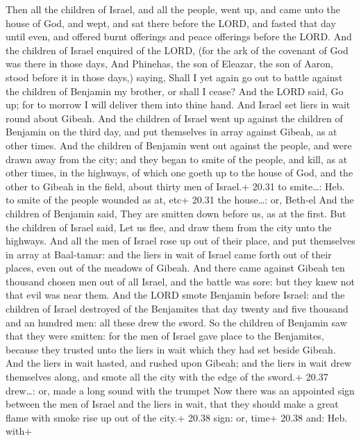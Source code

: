  Then all the children of Israel, and all the people,
went up, and came unto the house of God, and wept, and sat there before
the LORD, and fasted that day until even, and offered burnt offerings
and peace offerings before the LORD.  And the children of
Israel enquired of the LORD, (for the ark of the covenant of God was
there in those days,  And Phinehas, the son of Eleazar, the
son of Aaron, stood before it in those days,) saying, Shall I yet again
go out to battle against the children of Benjamin my brother, or shall I
cease? And the LORD said, Go up; for to morrow I will deliver them into
thine hand.  And Israel set liers in wait round about
Gibeah.  And the children of Israel went up against the
children of Benjamin on the third day, and put themselves in array
against Gibeah, as at other times.  And the children of
Benjamin went out against the people, and were drawn away from the city;
and they began to smite of the people, and kill, as at other times, in
the highways, of which one goeth up to the house of God, and the other
to Gibeah in the field, about thirty men of Israel.+ 20.31 to
smite\ldots: Heb. to smite of the people wounded as at, etc+ 20.31 the
house\ldots: or, Beth-el  And the children of Benjamin
said, They are smitten down before us, as at the first. But the children
of Israel said, Let us flee, and draw them from the city unto the
highways.  And all the men of Israel rose up out of their
place, and put themselves in array at Baal-tamar: and the liers in wait
of Israel came forth out of their places, even out of the meadows of
Gibeah.  And there came against Gibeah ten thousand chosen
men out of all Israel, and the battle was sore: but they knew not that
evil was near them.  And the LORD smote Benjamin before
Israel: and the children of Israel destroyed of the Benjamites that day
twenty and five thousand and an hundred men: all these drew the sword.
 So the children of Benjamin saw that they were smitten:
for the men of Israel gave place to the Benjamites, because they trusted
unto the liers in wait which they had set beside Gibeah. 
And the liers in wait hasted, and rushed upon Gibeah; and the liers in
wait drew themselves along, and smote all the city with the edge of the
sword.+ 20.37 drew\ldots: or, made a long sound with the trumpet
 Now there was an appointed sign between the men of Israel
and the liers in wait, that they should make a great flame with smoke
rise up out of the city.+ 20.38 sign: or, time+ 20.38 and: Heb. with+
